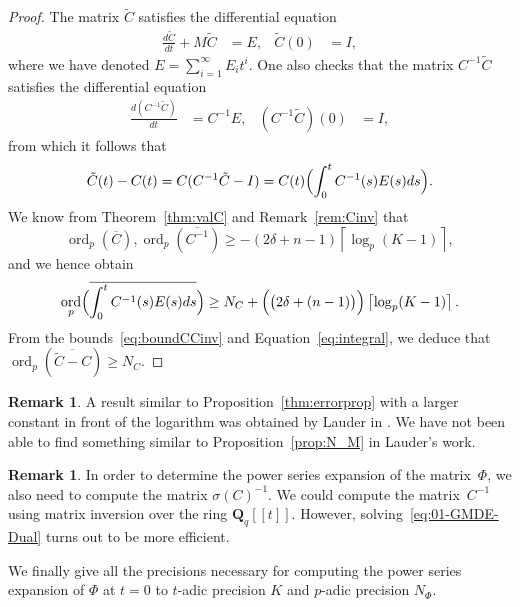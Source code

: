 \documentclass[a4paper,11pt]{article}
\numberwithin{equation}{section}
\providecommand{\ceil}[1]{\left\lceil#1\right\rceil}   %
\DeclareMathOperator{\ord}{ord}          %
\theoremstyle{definition}
\newtheorem{rem}[thm]{Remark}
\begin{document}
\begin{proof}
The matrix $\tilde{C}$ satisfies the differential equation
\begin{align*}
\frac{d\tilde{C}}{dt}+M \tilde{C}&=E, &\tilde{C}(0)&=I,
\end{align*}
where we have denoted $E=\sum_{i=1}^{\infty} E_i t^i$.
One also checks that the matrix $C^{-1}\tilde{C}$ satisfies 
the differential equation
\begin{align*}
\frac{d(C^{-1}\tilde{C})}{dt} &=C^{-1} E, &(C^{-1}\tilde{C})(0)&=I,
\end{align*}
from which it follows that
\begin{equation} \label{eq:integral}
\tilde{C}(t)-C(t) = C(C^{-1} \tilde{C}-I) = C(t) \Bigl(\int_{0}^t C^{-1}(s) E(s) ds \Bigr).
\end{equation}
We know from Theorem~\ref{thm:valC} and Remark~\ref{rem:Cinv} that
\begin{equation} \label{eq:boundCCinv}
\ord_p(\overline{C}),\ord_p(\overline{C^{-1}}) \geq 
-(2 \delta + n-1) \ceil{\log_p(K-1)},
\end{equation}
and we hence obtain
\[
\ord_p \Bigl(\overline{\int_{0}^t C^{-1}(s) E(s) ds }\Bigr) \geq 
N_{C} + \Bigl( \bigl(2 \delta + (n-1)\bigr) \Bigr) \ceil{\log_p(K-1)}.
\]
From the bounds~\eqref{eq:boundCCinv} and Equation~\eqref{eq:integral}, 
we deduce that $\ord_p(\overline{\tilde{C}-C}) \geq N_C$.
\end{proof}

\begin{rem}
A result similar to Proposition~\ref{thm:errorprop} with a larger constant in front of 
the logarithm was obtained by Lauder in \citep[Theorem 5.1]{Lauder2006}. We have
not been able to find something similar to Proposition~\ref{prop:N_M} in Lauder's work.
\end{rem}

\begin{rem} \label{rem:sigmatrick}
In order to determine the power series expansion of the matrix~$\Phi$, 
we also need to compute the matrix $\sigma(C)^{-1}$. We could compute 
the matrix~$C^{-1}$ using matrix inversion over the ring $\mathbf{Q}_q[[t]]$. 
However, solving~\eqref{eq:01-GMDE-Dual} turns
out to be more efficient. 
\end{rem}

We finally give all the precisions necessary for computing the power series 
expansion of $\Phi$ at $t=0$ to $t$-adic precision $K$ and $p$-adic 
precision $N_{\Phi}$.
\end{document}

